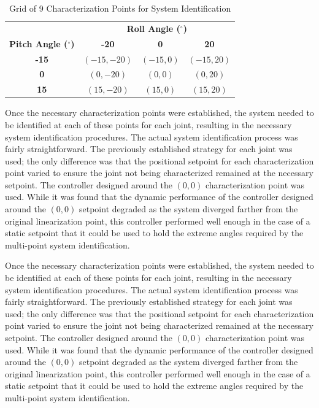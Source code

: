 \begin{table}[htbp]
    \centering
    \caption{Grid of 9 Characterization Points for System Identification}
    \label{tab:characterization_points}
    \begin{tabular}{c|ccc} %
        \multicolumn{1}{c}{} & \multicolumn{3}{c}{\textbf{Roll Angle ($^\circ$)}} \\
        \cmidrule(lr){2-4} %
        \cmidrule(lr){1-1} %
        \textbf{Pitch Angle ($^\circ$)} & \textbf{-20} & \textbf{0} & \textbf{20} \\
        \midrule %
        \textbf{-15} & $(-15, -20)$ & $(-15, 0)$ & $(-15, 20)$ \\
        \textbf{0}    & $(0, -20)$    & $(0, 0)$    & $(0, 20)$    \\
        \textbf{15}   & $(15, -20)$  & $(15, 0)$  & $(15, 20)$  \\
        \bottomrule
    \end{tabular}
\end{table}

Once the necessary characterization points were established, the system needed to be identified at each of these points for each joint, resulting in the necessary system identification procedures. The actual system identification process was fairly straightforward. The previously established strategy for each joint was used; the only difference was that the positional setpoint for each characterization point varied to ensure the joint not being characterized remained at the necessary setpoint. The controller designed around the $(0,0)$ characterization point was used. While it was found that the dynamic performance of the controller designed around the $(0,0)$ setpoint degraded as the system diverged farther from the original linearization point, this controller performed well enough in the case of a static setpoint that it could be used to hold the extreme angles required by the multi-point system identification.

Once the necessary characterization points were established, the system needed to be identified at each of these points for each joint, resulting in the necessary system identification procedures. The actual system identification process was fairly straightforward. The previously established strategy for each joint was used; the only difference was that the positional setpoint for each characterization point varied to ensure the joint not being characterized remained at the necessary setpoint. The controller designed around the $(0,0)$ characterization point was used. While it was found that the dynamic performance of the controller designed around the $(0,0)$ setpoint degraded as the system diverged farther from the original linearization point, this controller performed well enough in the case of a static setpoint that it could be used to hold the extreme angles required by the multi-point system identification.


